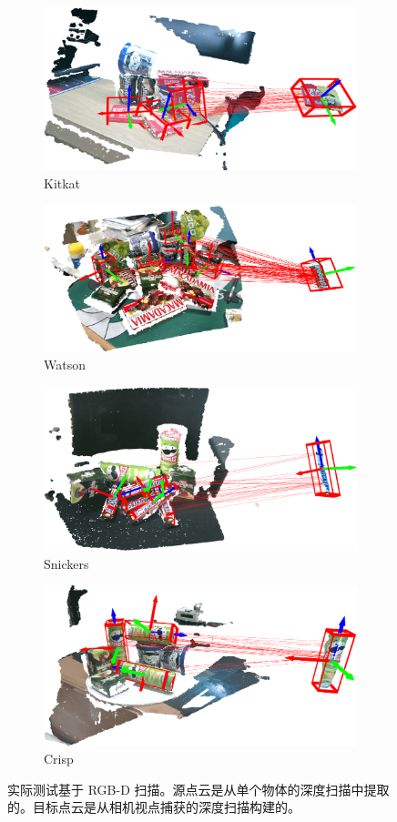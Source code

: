 \begin{figure}[h]
  \centering   
  \begin{subfigure}{0.3\textwidth}
    \centering
    \includegraphics[height=2.cm]{images/real1.png}
      \caption{Kitkat}
      \label{fig:real1}
  \end{subfigure}
  \begin{subfigure}{0.3\textwidth}
    \centering
    \includegraphics[height=2.cm]{images/real2.png}
      \caption{Watson}
      \label{fig:real2}
  \end{subfigure}


    \begin{subfigure}{0.3\textwidth}
    \centering
    \includegraphics[height=2.cm]{images/real3.png}
      \caption{Snickers}
      \label{fig:real3}
  \end{subfigure}
  \begin{subfigure}{0.3\textwidth}
    \centering
    \includegraphics[height=2.cm]{images/real4.png}
      \caption{Crisp}
      \label{fig:real4}
  \end{subfigure}
  \caption{实际测试基于 RGB-D 扫描。源点云是从单个物体的深度扫描中提取的。目标点云是从相机视点捕获的深度扫描构建的。}
\label{fig:app}
\end{figure}

